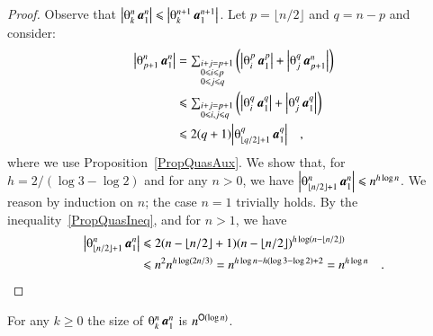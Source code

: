 \begin{proof}
Observe that $\size{\th kn\avec1n}\le\size{\th k{n+1}\avec1{n+1}}$. Let $p=\lfloor n/2\rfloor$ and $q=n-p$ and consider:
\begin{equation}\label{PropQuasIneq}
\begin{split}
\size{\th{p+1}n\avec1n}
&=\textstyle\sum_{\begin{subarray}{l}i+j=p+1    \\
                                     0\le i\le p\\
                                     0\le j\le q
                  \end{subarray}}
  \left(\size{\th ip\avec1p}+
        \size{\th jq\avec{p+1}n}\right)             \\
&\le\textstyle\sum_{\begin{subarray}{l}i+j=p+1\\
                                       0\le i,j\le q
                    \end{subarray}}
  \left(\size{\th iq\avec1q}+
        \size{\th jq\avec1q}\right)                 \\
&\le2(q+1)
  \size{\th{\lfloor q/2\rfloor+1}q\avec1q}\quad,
\end{split}
\end{equation}
where we use Proposition~\ref{PropQuasAux}. We show that, for $h=2/(\log3-\log2)$ and for any $n>0$, we have $\size{\th{\lfloor n/2\rfloor+1}n\avec1n}\le n^{h\log n}$. We reason by induction on $n$; the case $n=1$ trivially holds. By the inequality~\eqref{PropQuasIneq}, and for $n>1$, we have
\begin{equation*}
\begin{split}
\size{\th{\lfloor n/2\rfloor+1}n\avec1n}
&\le2(n-\lfloor n/2\rfloor+1)
     (n-\lfloor n/2\rfloor)^{h\log(n-\lfloor n/2\rfloor)}       \\
&\le n^2n^{h\log(2n/3)}=n^{h\log n-h(\log3-\log2)+2}=n^{h\log n}
\quad.
\end{split}
\end{equation*}
\end{proof}

\begin{theorem}\label{theorem:SizeThreshold}
For any $k\ge0$ the size of\/ $\th kn\avec1n$ is $n^{{\mathsf O}(\log n)}$.
\end{theorem}

